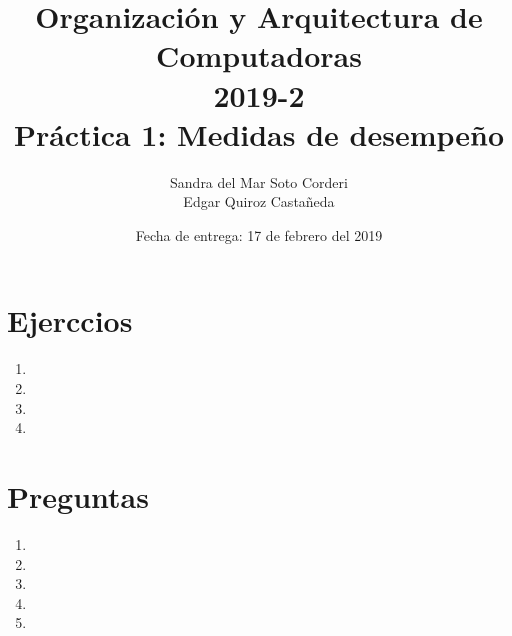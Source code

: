\documentclass{article}
\begin{document}
    
    \title{Organización y Arquitectura de Computadoras\\
    \large 2019-2 \\
    \large Práctica 1: Medidas de desempeño}

    \date{Fecha de entrega: 17 de febrero del 2019}

    \author{Sandra del Mar Soto Corderi\\
    Edgar Quiroz Castañeda}

    \maketitle



    \section{Ejerccios}

    \begin{enumerate}
        \item {}
        \item {}
        \item {}
        \item {}
    \end{enumerate}

    \section{Preguntas}

    \begin{enumerate}
        \item {}
        \item {}
        \item {}
        \item {}
        \item {}
    \end{enumerate}
\end{document}
